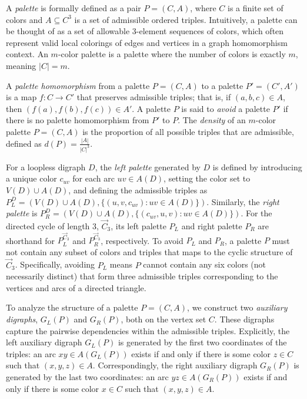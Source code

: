 \documentclass[a4paper]{amsart}
\begin{document}
A \emph{palette} is formally defined as a pair $P = (C, A)$, where $C$ is a finite set of colors and $A \subseteq C^3$ is a set of admissible ordered triples.
Intuitively, a palette can be thought of as a set of allowable 3-element sequences of colors, which often represent valid local colorings of edges and vertices in a graph homomorphism context.
An $m$-color palette is a palette where the number of colors is exactly $m$, meaning $|C| = m$.

A \emph{palette homomorphism} from a palette $P = (C, A)$ to a palette $P' = (C', A')$ is a map $f: C \to C'$ that preserves admissible triples; that is, if $(a, b, c) \in A$, then $(f(a), f(b), f(c)) \in A'$.
A palette $P$ is said to \emph{avoid} a palette $P'$ if there is no palette homomorphism from $P'$ to $P$.
The \emph{density} of an $m$-color palette $P = (C, A)$ is the proportion of all possible triples that are admissible, defined as $d(P) = \frac{|A|}{|C|^3}$.

For a loopless digraph $D$, the \emph{left palette} generated by $D$ is defined by introducing a unique color $c_{uv}$ for each arc $uv \in A(D)$, setting the color set to $V(D) \cup A(D)$, and defining the admissible triples as $P_L^D = (V(D) \cup A(D), \{(u, v, c_{uv}) : uv \in A(D)\})$.
Similarly, the \emph{right palette} is $P_R^D = (V(D) \cup A(D), \{(c_{uv}, u, v) : uv \in A(D)\})$.
For the directed cycle of length 3, $\vec{C}_3$, its left palette $P_L$ and right palette $P_R$ are shorthand for $P_L^{\vec{C}_3}$ and $P_R^{\vec{C}_3}$, respectively.
To avoid $P_L$ and $P_R$, a palette $P$ must not contain any subset of colors and triples that maps to the cyclic structure of $\vec{C}_3$. Specifically, avoiding $P_L$ means $P$ cannot contain any six colors (not necessarily distinct) that form three admissible triples corresponding to the vertices and arcs of a directed triangle.

To analyze the structure of a palette $P = (C, A)$, we construct two \emph{auxiliary digraphs}, $G_L(P)$ and $G_R(P)$, both on the vertex set $C$.
These digraphs capture the pairwise dependencies within the admissible triples.
Explicitly, the left auxiliary digraph $G_L(P)$ is generated by the first two coordinates of the triples: an arc $xy \in A(G_L(P))$ exists if and only if there is some color $z \in C$ such that $(x, y, z) \in A$.
Correspondingly, the right auxiliary digraph $G_R(P)$ is generated by the last two coordinates: an arc $yz \in A(G_R(P))$ exists if and only if there is some color $x \in C$ such that $(x, y, z) \in A$.
\end{document}

